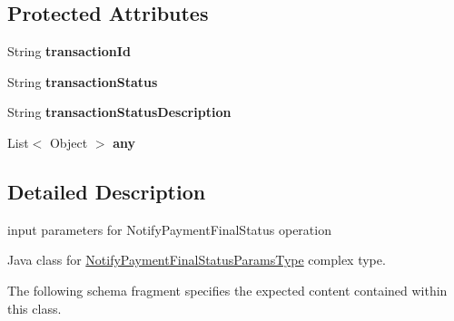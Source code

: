 \subsection*{Protected Attributes}
\begin{DoxyCompactItemize}
\item 
\hypertarget{classcom_1_1telefonica_1_1schemas_1_1unica_1_1rpc_1_1payment_1_1v1_1_1NotifyPaymentFinalStatusParamsType_ac2a61115c75222e751c03b0f9711fe7e}{
String {\bfseries transactionId}}
\label{classcom_1_1telefonica_1_1schemas_1_1unica_1_1rpc_1_1payment_1_1v1_1_1NotifyPaymentFinalStatusParamsType_ac2a61115c75222e751c03b0f9711fe7e}

\item 
\hypertarget{classcom_1_1telefonica_1_1schemas_1_1unica_1_1rpc_1_1payment_1_1v1_1_1NotifyPaymentFinalStatusParamsType_a2f72ac3bd012ca295a476d61efb43e7a}{
String {\bfseries transactionStatus}}
\label{classcom_1_1telefonica_1_1schemas_1_1unica_1_1rpc_1_1payment_1_1v1_1_1NotifyPaymentFinalStatusParamsType_a2f72ac3bd012ca295a476d61efb43e7a}

\item 
\hypertarget{classcom_1_1telefonica_1_1schemas_1_1unica_1_1rpc_1_1payment_1_1v1_1_1NotifyPaymentFinalStatusParamsType_a5dd0dc23d441f5e3bbf1c863432a69bf}{
String {\bfseries transactionStatusDescription}}
\label{classcom_1_1telefonica_1_1schemas_1_1unica_1_1rpc_1_1payment_1_1v1_1_1NotifyPaymentFinalStatusParamsType_a5dd0dc23d441f5e3bbf1c863432a69bf}

\item 
\hypertarget{classcom_1_1telefonica_1_1schemas_1_1unica_1_1rpc_1_1payment_1_1v1_1_1NotifyPaymentFinalStatusParamsType_a7e52107b663df2feec68ff964e542d78}{
List$<$ Object $>$ {\bfseries any}}
\label{classcom_1_1telefonica_1_1schemas_1_1unica_1_1rpc_1_1payment_1_1v1_1_1NotifyPaymentFinalStatusParamsType_a7e52107b663df2feec68ff964e542d78}

\end{DoxyCompactItemize}


\subsection{Detailed Description}
input parameters for NotifyPaymentFinalStatus operation

Java class for \hyperlink{classcom_1_1telefonica_1_1schemas_1_1unica_1_1rpc_1_1payment_1_1v1_1_1NotifyPaymentFinalStatusParamsType}{NotifyPaymentFinalStatusParamsType} complex type.

The following schema fragment specifies the expected content contained within this class.



